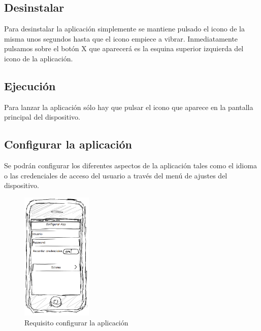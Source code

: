 \subsection{Desinstalar}
Para desinstalar la aplicación simplemente se mantiene pulsado el icono de la misma unos segundos hasta que el icono empiece a vibrar. Inmediatamente pulsamos sobre el botón \textsf{X} que aparecerá es la esquina superior izquierda del icono de la aplicación. 
\subsection{Ejecución}
Para lanzar la aplicación sólo hay que pulsar el icono que aparece en la pantalla principal del dispositivo.
\subsection{Configurar la aplicación}
Se podrán configurar los diferentes aspectos de la aplicación tales como el idioma o las credenciales de acceso del  usuario a través del menú de ajustes del dispositivo. 
\begin{figure}[H]
    \centering
       \includegraphics[width=0.3\textwidth]{./images/req_conf_app.png}
     \caption{Requisito configurar la aplicación}
   \label{fig:Requisito configurar la aplicación}
\end{figure}
